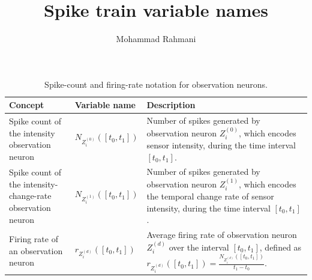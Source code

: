 \documentclass[a4paper]{article}
\title{Spike train variable names}
\date{}
\author{Mohammad Rahmani}
\begin{document}
   \maketitle
   \begin{table}[H]

      \centering

      \small

      \setlength{\tabcolsep}{4pt}

      \begin{tabular}{p{} p{} p{}}

         \hline

         \textbf{Concept} & \textbf{Variable name} & \textbf{Description} \\

         \hline

         Spike count of the intensity observation neuron
         & $N_{Z_i^{(0)}}([t_0,t_1])$
         & Number of spikes generated by observation neuron $Z_i^{(0)}$, which encodes sensor intensity, during the time interval $[t_0,t_1]$. \\

         Spike count of the intensity-change-rate observation neuron
         & $N_{Z_i^{(1)}}([t_0,t_1])$
         & Number of spikes generated by observation neuron $Z_i^{(1)}$, which encodes the temporal change rate of sensor intensity, during the time interval $[t_0,t_1]$. \\

         Firing rate of an observation neuron
         & $r_{Z_i^{(d)}}([t_0,t_1])$
         & Average firing rate of observation neuron $Z_i^{(d)}$ over the interval $[t_0,t_1]$, defined as $r_{Z_i^{(d)}}([t_0,t_1])=\frac{N_{Z_i^{(d)}}([t_0,t_1])}{t_1-t_0}$. \\

         \hline

      \end{tabular}

      \caption{Spike-count and firing-rate notation for observation neurons.}

      \label{table_observation_neuron_spike_count_firing_rate}

   \end{table}

   
   
\end{document}
